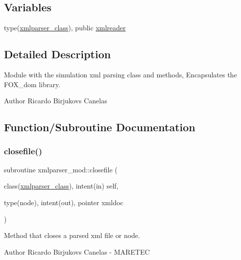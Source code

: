 \subsection*{Variables}
\begin{DoxyCompactItemize}
\item 
type(\mbox{\hyperlink{structxmlparser__mod_1_1xmlparser__class}{xmlparser\+\_\+class}}), public \mbox{\hyperlink{namespacexmlparser__mod_a482bd93d0a4ba8c9c2000713a4b14799}{xmlreader}}
\end{DoxyCompactItemize}


\subsection{Detailed Description}
Module with the simulation xml parsing class and methods, Encapsulates the F\+O\+X\+\_\+dom library. 

\begin{DoxyAuthor}{Author}
Ricardo Birjukovs Canelas 
\end{DoxyAuthor}


\subsection{Function/\+Subroutine Documentation}
\mbox{\label{namespacexmlparser__mod_a9eed98475e0d55a3c7b2eeb88925a48c}} 
\subsubsection{\texorpdfstring{closefile()}{closefile()}}
{\footnotesize\ttfamily subroutine xmlparser\+\_\+mod\+::closefile (\begin{DoxyParamCaption}\item[{class(\mbox{\hyperlink{structxmlparser__mod_1_1xmlparser__class}{xmlparser\+\_\+class}}), intent(in)}]{self,  }\item[{type(node), intent(out), pointer}]{xmldoc }\end{DoxyParamCaption})\hspace{0.3cm}{\ttfamily [private]}}



Method that closes a parsed xml file or node. 

\begin{DoxyAuthor}{Author}
Ricardo Birjukovs Canelas -\/ M\+A\+R\+E\+T\+EC 
\end{DoxyAuthor}

